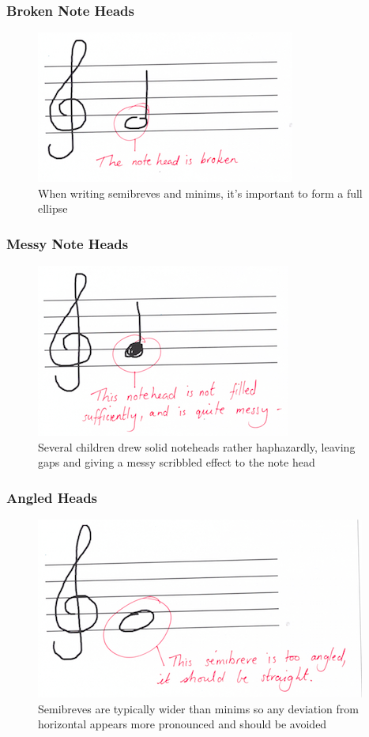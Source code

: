 \subsubsection{Broken Note Heads}\label{sec:tf-note-head-broken}

\begin{figure}[H]
  \centering
  \includegraphics[width=.6\linewidth]{gfx/teacher-notes/mistake-notehead-broken.png}
  \caption{When writing semibreves and minims, it's important to form a full ellipse}
\end{figure}

\subsubsection{Messy Note Heads}\label{sec:tf-note-head-messy}

\begin{figure}[H]
  \centering
  \includegraphics[width=.6\linewidth]{gfx/teacher-notes/mistake-notehead-messy.png}
  \caption{Several children drew solid noteheads rather haphazardly, leaving gaps and giving a messy scribbled effect to the note head}
\end{figure}

\subsubsection{Angled Heads}\label{sec:tf-semibreve-angled}


\begin{figure}[H]
  \centering
  \includegraphics[width=.6\linewidth]{gfx/teacher-notes/mistake-notehead-angled.png}
  \caption{Semibreves are typically wider than minims so any deviation from horizontal appears more pronounced and should be avoided}
\end{figure}

